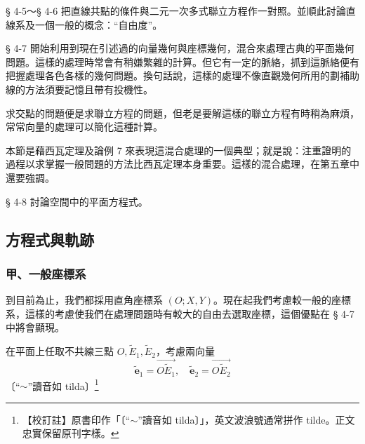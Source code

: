 § 4-5～§ 4-6 把直線共點的條件與二元一次多式聯立方程作一對照。並順此討論直線系及一個一般的概念：“自由度”。

§ 4-7 開始利用到現在引述過的向量幾何與座標幾何，混合來處理古典的平面幾何問題。這樣的處理時常會有稍嫌繁雜的計算。但它有一定的脈絡，抓到這脈絡便有把握處理各色各樣的幾何問題。換句話說，這樣的處理不像直觀幾何所用的劃補助線的方法須要記憶且帶有投機性。

求交點的問題便是求聯立方程的問題，但老是要解這樣的聯立方程有時稍為麻煩，常常向量的處理可以簡化這種計算。

本節是藉西瓦定理及論例 7 來表現這混合處理的一個典型；就是說：注重證明的過程以求掌握一般問題的方法比西瓦定理本身重要。這樣的混合處理，在第五章中還要強調。

§ 4-8 討論空間中的平面方程式。

\subsection{方程式與軌跡}
\label{sec:4-1}

\subsubsection*{甲、一般座標系}

到目前為止，我們都採用直角座標系 $(O; X, Y)$。現在起我們考慮較一般的座標系，這樣的考慮使我們在處理問題時有較大的自由去選取座標，這個優點在 § 4-7 中將會顯現。

在平面上任取不共線三點 $O, \tilde{E}_1, \tilde{E}_2$，考慮兩向量
\[ \tilde{\mathbf{e}}_1 = \vec{O\tilde{E}_1}, \quad \tilde{\mathbf{e}}_2 = \vec{O\tilde{E}_2} \]
〔“$\sim$”讀音如 tilda〕\label{note:b3-ch4-p132-tilde-pronounce}\footnote{【校訂註】原書印作「〔“$\sim$”讀音如 tilda〕」，英文波浪號通常拼作 tilde。正文忠實保留原刊字樣。}

